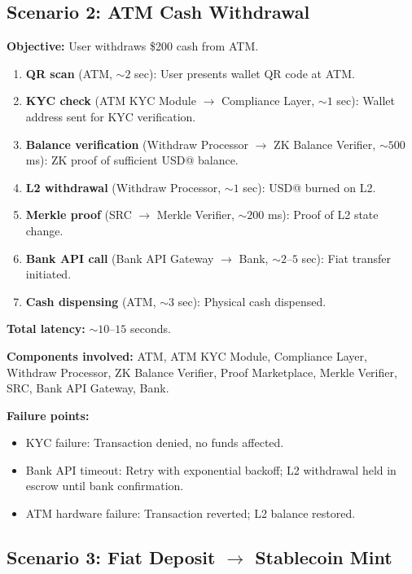\documentclass[12pt,a4paper]{article}
\theoremstyle{definition}
\theoremstyle{remark}
\newcommand{\USD}[1]{\$#1}
\begin{document}
\subsection{Scenario 2: ATM Cash Withdrawal}

\textbf{Objective:} User withdraws \USD{200} cash from ATM.

\begin{enumerate}[nosep]
    \item \textbf{QR scan} (ATM, ${\sim}2$ sec): User presents wallet QR code at ATM.
    \item \textbf{KYC check} (ATM KYC Module $\to$ Compliance Layer, ${\sim}1$ sec): Wallet address sent for KYC verification.
    \item \textbf{Balance verification} (Withdraw Processor $\to$ ZK Balance Verifier, ${\sim}500$ ms): ZK proof of sufficient USD@ balance.
    \item \textbf{L2 withdrawal} (Withdraw Processor, ${\sim}1$ sec): USD@ burned on L2.
    \item \textbf{Merkle proof} (SRC $\to$ Merkle Verifier, ${\sim}200$ ms): Proof of L2 state change.
    \item \textbf{Bank API call} (Bank API Gateway $\to$ Bank, ${\sim}2$--$5$ sec): Fiat transfer initiated.
    \item \textbf{Cash dispensing} (ATM, ${\sim}3$ sec): Physical cash dispensed.
\end{enumerate}

\textbf{Total latency:} ${\sim}10$--$15$ seconds.

\textbf{Components involved:} ATM, ATM KYC Module, Compliance Layer, Withdraw Processor, ZK Balance Verifier, Proof Marketplace, Merkle Verifier, SRC, Bank API Gateway, Bank.

\textbf{Failure points:}
\begin{itemize}[nosep]
    \item KYC failure: Transaction denied, no funds affected.
    \item Bank API timeout: Retry with exponential backoff; L2 withdrawal held in escrow until bank confirmation.
    \item ATM hardware failure: Transaction reverted; L2 balance restored.
\end{itemize}

\subsection{Scenario 3: Fiat Deposit $\to$ Stablecoin Mint}
\end{document}
